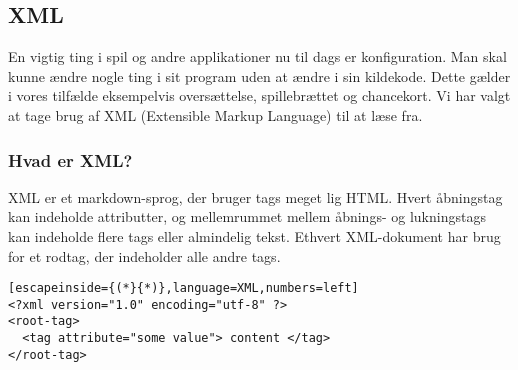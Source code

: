 \documentclass[../../main.tex]{subfiles}
\begin{document}
\begin{flushleft}
\subsection{XML}
En vigtig ting i spil og andre applikationer nu til dags er konfiguration. Man skal kunne ændre nogle ting i sit program uden at ændre i sin kildekode. Dette gælder i vores tilfælde eksempelvis oversættelse, spillebrættet og chancekort. Vi har valgt at tage brug af XML (Extensible Markup Language) til at læse fra. 

\subsubsection{Hvad er XML?}
XML er et markdown-sprog, der bruger tags meget lig HTML. Hvert åbningstag kan indeholde attributter, og mellemrummet mellem åbnings- og lukningstags kan indeholde flere tags eller almindelig tekst. Ethvert XML-dokument har brug for et rodtag, der indeholder alle andre tags.


\begin{lstlisting}[escapeinside={(*}{*)},language=XML,numbers=left]
<?xml version="1.0" encoding="utf-8" ?>
<root-tag> 
  <tag attribute="some value"> content </tag>
</root-tag>
\end{lstlisting}
\end{flushleft}
\end{document}
